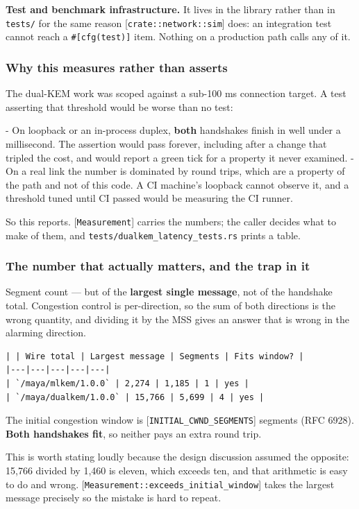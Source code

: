 \documentclass[11pt,a4paper]{article}
\begin{document}
\textbf{Test and benchmark infrastructure.} It lives in the library rather than
in \texttt{tests/} for the same reason [\texttt{crate::network::sim}] does: an integration
test cannot reach a \texttt{\#[cfg(test)]} item. Nothing on a production path calls
any of it.

\subsubsection{Why this measures rather than asserts}

The dual-KEM work was scoped against a sub-100 ms connection target. A test
asserting that threshold would be worse than no test:

- On loopback or an in-process duplex, \textbf{both} handshakes finish in well
  under a millisecond. The assertion would pass forever, including after a
  change that tripled the cost, and would report a green tick for a
  property it never examined.
- On a real link the number is dominated by round trips, which are a
  property of the path and not of this code. A CI machine's loopback cannot
  observe it, and a threshold tuned until CI passed would be measuring the
  CI runner.

So this reports. [\texttt{Measurement}] carries the numbers; the caller decides
what to make of them, and \texttt{tests/dualkem\_latency\_tests.rs} prints a table.

\subsubsection{The number that actually matters, and the trap in it}

Segment count — but of the \textbf{largest single message}, not of the handshake
total. Congestion control is per-direction, so the sum of both directions is
the wrong quantity, and dividing it by the MSS gives an answer that is wrong
in the alarming direction.

\begin{verbatim}
| | Wire total | Largest message | Segments | Fits window? |
|---|---|---|---|---|
| `/maya/mlkem/1.0.0` | 2,274 | 1,185 | 1 | yes |
| `/maya/dualkem/1.0.0` | 15,766 | 5,699 | 4 | yes |
\end{verbatim}

The initial congestion window is [\texttt{INITIAL\_CWND\_SEGMENTS}] segments
(RFC 6928). \textbf{Both handshakes fit}, so neither pays an extra round trip.

This is worth stating loudly because the design discussion assumed the
opposite: 15,766 divided by 1,460 is eleven, which exceeds ten, and that
arithmetic is easy to do and wrong. [\texttt{Measurement::exceeds\_initial\_window}]
takes the largest message precisely so the mistake is hard to repeat.
\end{document}
